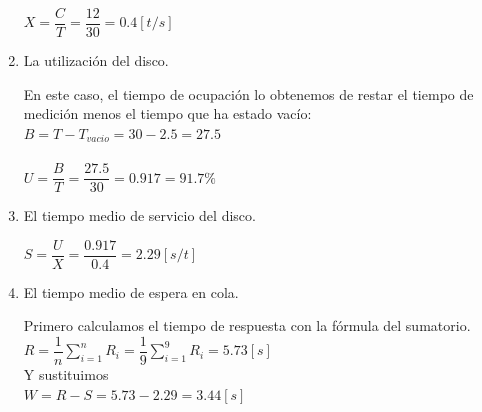 \begin{enumerate}
\begin{tcolorbox}[colback=white,colframe=cyan!50!black,fonttitle=\bfseries]
$X = \dfrac{C}{T}=\dfrac{12}{30}=0.4[t/s]$
    \end{tcolorbox}
    \item La utilización del disco.
    \begin{tcolorbox}[colback=white,colframe=cyan!50!black,fonttitle=\bfseries]
    En este caso, el tiempo de ocupación lo obtenemos de restar el tiempo de medición menos el tiempo que ha estado vacío:\\ $B = T-T_{vacio} = 30-2.5=27.5$\\\\
    $U = \dfrac{B}{T}=\dfrac{27.5}{30}=0.917=91.7\%$
    \end{tcolorbox}
    \item El tiempo medio de servicio del disco.
    \begin{tcolorbox}[colback=white,colframe=cyan!50!black,fonttitle=\bfseries]
$S = \dfrac{U}{X}=\dfrac{0.917}{0.4}=2.29[s/t]$
    \end{tcolorbox}
    \item El tiempo medio de espera en cola.
    \begin{tcolorbox}[colback=white,colframe=cyan!50!black,fonttitle=\bfseries]
    Primero calculamos el tiempo de respuesta con la fórmula del sumatorio.\\
    $R = \dfrac{1}{n}\sum_{i=1}^{n}R_i = \dfrac{1}{9}\sum_{i=1}^{9}R_i=5.73[s]$\\
    Y sustituimos\\
    $W = R-S = 5.73-2.29=3.44[s]$
    \end{tcolorbox}
\end{enumerate}

